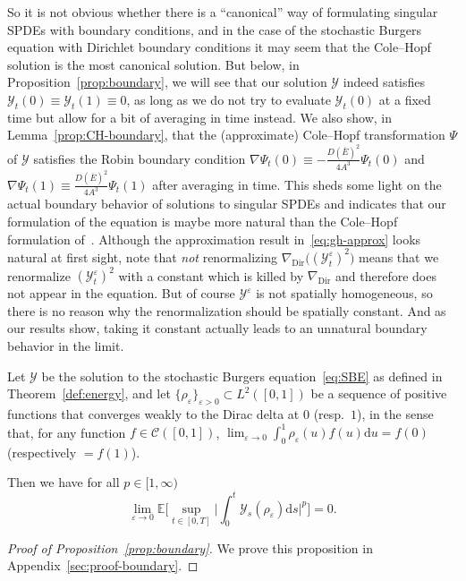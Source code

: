 \documentclass[10pt]{amsart}
\theoremstyle{definition}\newtheorem{defi}[theo]{Definition}\newtheorem{rema}[theo]{Remark}\newtheorem{exam}[theo]{Example}\newtheorem{exem}[theo]{Example}\newtheorem{nota}[theo]{Notation}
\DeclareMathOperator{\Dir}{Dir}
\newcommand{\mc}[1]{{\mathcal #1}}
\renewcommand{\mc}[1]{{\mathcal #1}}
\renewcommand{\bar}{\overline}
\newcommand*{\dd}{\mathrm{d}}
\newcommand*{\ds}{\dd s}
\newcommand*{\du}{\dd u}
\renewcommand{\tfrac}{\frac}
\begin{document}
So it is not obvious whether there is a ``canonical'' way of formulating singular SPDEs with boundary conditions, and in the case of the stochastic Burgers equation with Dirichlet boundary conditions it may seem that the Cole--Hopf solution is the most canonical solution. But below, in Proposition~\ref{prop:boundary}, we will see that our solution $\mc Y$ indeed satisfies $\mc Y_t(0) \equiv \mc Y_t(1) \equiv 0$, as long as we do not try to evaluate $\mc Y_t(0)$ at a fixed time but allow for a bit of averaging in time instead. We also show, in Lemma~\ref{prop:CH-boundary}, that the (approximate) Cole--Hopf transformation $\Psi$ of $\mc Y$ satisfies the Robin boundary condition $\nabla \Psi_t(0) \equiv - \tfrac{D(\bar{E})^2}{4A^3} \Psi_t(0)$ and $\nabla \Psi_t(1) \equiv \tfrac{D(\bar{E})^2}{4A^3} \Psi_t(1)$ after averaging in time. This sheds some light on the actual boundary behavior of solutions to singular SPDEs and indicates that our formulation of the equation is maybe more natural than the Cole--Hopf formulation of~\cite{Corwin2016}. Although the approximation result in~\eqref{eq:gh-approx} looks natural at first sight, note that \emph{not} renormalizing $ \nabla_{\Dir} \big((\mc Y^\varepsilon_t)^2\big)$ means that we renormalize $(\mc Y^\varepsilon_t)^2$ with a constant which is killed by $\nabla_{\Dir}$ and therefore does not appear in the equation. But of course $\mc Y^\varepsilon$ is not spatially homogeneous, so there is no reason why the renormalization should be spatially constant. And as our results show, taking it constant actually leads to an unnatural boundary behavior in the limit.

\begin{prop}\label{prop:boundary}
Let $\mc Y$ be the solution to the stochastic Burgers equation~\eqref{eq:SBE} as defined in Theorem~\ref{def:energy}, and let $\{\rho_{\varepsilon}\}_{\varepsilon >0} \subset L^2 ([0, 1])$ be a sequence of positive functions that converges weakly to the Dirac delta at $0$ (resp.~$1$), in the sense that, for any function $f \in \mc C ([0, 1])$, $\lim_{\varepsilon
\rightarrow 0} \int_0^1\rho_{\varepsilon}(u) f(u)\du = f (0)$ (respectively $= f (1)$).


Then we have for all $p \in [1, \infty)$
\[
\lim_{\varepsilon \rightarrow 0} \mathbb{E} \bigg[\sup_{t \in [0,T]}
\bigg| \int_0^t \mc Y_s (\rho_{\varepsilon}) \ds \bigg|^p \bigg] = 0.
\]
\end{prop}

\begin{proof}[Proof of Proposition~\ref{prop:boundary}]
We prove this proposition in Appendix~\ref{sec:proof-boundary}.
\end{proof}
\end{document}
